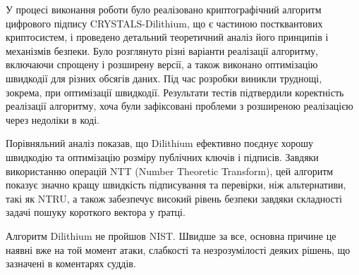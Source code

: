 \documentclass[12pt]{HomusWorkus}
\begin{document}
У процесі виконання роботи було реалізовано криптографічний алгоритм цифрового підпису CRYSTALS-Dilithium, що є частиною постквантових криптосистем, і проведено детальний теоретичний аналіз його принципів і механізмів безпеки. Було розглянуто різні варіанти реалізації алгоритму, включаючи спрощену і розширену версії, а також виконано оптимізацію швидкодії для різних обсягів даних. Під час розробки виникли труднощі, зокрема, при оптимізації швидкодії. Результати тестів підтвердили коректність реалізації алгоритму, хоча були зафіксовані проблеми з розширеною реалізацією через недоліки в коді.

Порівняльний аналіз показав, що Dilithium ефективно поєднує хорошу швидкодію та оптимізацію розміру публічних ключів і підписів. Завдяки використанню операцій NTT (Number Theoretic Transform), цей алгоритм показує значно кращу швидкість підписування та перевірки, ніж альтернативи, такі як NTRU, а також забезпечує високий рівень безпеки завдяки складності задачі пошуку короткого вектора у ґратці.

Алгоритм Dilithium не пройшов NIST. Швидше за все, основна причине це наявні вже на той момент атаки, слабкості та незрозумілості деяких рішень, що зазначені в коментарях суддів.







\end{document}
